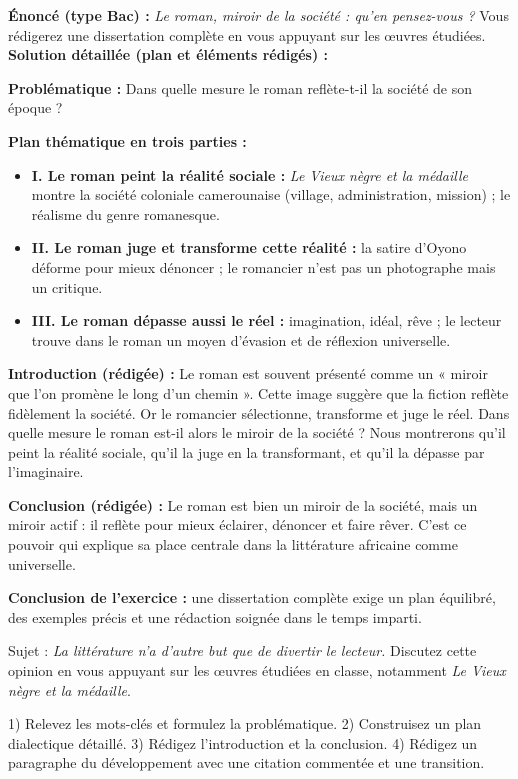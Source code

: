 \documentclass[11pt]{article}
\begin{document}
\begin{exoresolu}
\textbf{Énoncé (type Bac) :} \emph{Le roman, miroir de la société : qu'en pensez-vous ?} Vous rédigerez une dissertation complète en vous appuyant sur les œuvres étudiées.
\tcblower
\textbf{Solution détaillée (plan et éléments rédigés) :}
\par \textbf{Problématique :} Dans quelle mesure le roman reflète-t-il la société de son époque ?
\par \textbf{Plan thématique en trois parties :}
\begin{itemize}
\item \textbf{I. Le roman peint la réalité sociale :} \emph{Le Vieux nègre et la médaille} montre la société coloniale camerounaise (village, administration, mission) ; le réalisme du genre romanesque.
\item \textbf{II. Le roman juge et transforme cette réalité :} la satire d'Oyono déforme pour mieux dénoncer ; le romancier n'est pas un photographe mais un critique.
\item \textbf{III. Le roman dépasse aussi le réel :} imagination, idéal, rêve ; le lecteur trouve dans le roman un moyen d'évasion et de réflexion universelle.
\end{itemize}
\par \textbf{Introduction (rédigée) :} Le roman est souvent présenté comme un « miroir que l'on promène le long d'un chemin ». Cette image suggère que la fiction reflète fidèlement la société. Or le romancier sélectionne, transforme et juge le réel. Dans quelle mesure le roman est-il alors le miroir de la société ? Nous montrerons qu'il peint la réalité sociale, qu'il la juge en la transformant, et qu'il la dépasse par l'imaginaire.
\par \textbf{Conclusion (rédigée) :} Le roman est bien un miroir de la société, mais un miroir actif : il reflète pour mieux éclairer, dénoncer et faire rêver. C'est ce pouvoir qui explique sa place centrale dans la littérature africaine comme universelle.
\par \textbf{Conclusion de l'exercice :} une dissertation complète exige un plan équilibré, des exemples précis et une rédaction soignée dans le temps imparti.
\end{exoresolu}

\begin{exercice}
Sujet : \emph{La littérature n'a d'autre but que de divertir le lecteur.} Discutez cette opinion en vous appuyant sur les œuvres étudiées en classe, notamment \emph{Le Vieux nègre et la médaille}.
\par 1) Relevez les mots-clés et formulez la problématique. 2) Construisez un plan dialectique détaillé. 3) Rédigez l'introduction et la conclusion. 4) Rédigez un paragraphe du développement avec une citation commentée et une transition.
\end{exercice}
\end{document}
